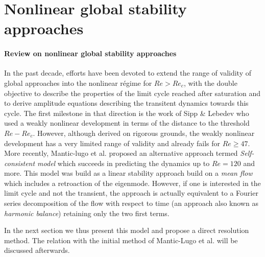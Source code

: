 \documentclass[twocolumn,10pt]{asme2ej}
\begin{document}
\section{Nonlinear global stability approaches}
\vspace{.2cm}

\paragraph{Review on nonlinear global stability approaches}
In the past decade, efforts have been devoted to extend the range of validity of global approaches into the nonlinear régime for $Re>Re_c$, with the double objective to describe the properties of the limit cycle reached after saturation and to derive amplitude equations describing the transitent dynamics towards this cycle.
 The first milestone in that direction is the work of Sipp \& Lebedev who used a weakly nonlinear development in terms of the distance to the threshold $Re-Re_c$. However, although derived on rigorous grounds, the weakly nonlinear development has a very limited range of validity and already fails for $Re\ge47$.
More recently,  Mantic-lugo et al.  proposed an alternative approach termed {\em Self-consistent model} which succeeds in predicting the dynamics up to $Re =120$ and more. 
This model was build as a linear stability approach build on a {\em mean flow} which includes a 
retroaction of the eigenmode. However, if one is interested in the limit cycle and not the transient,
the approach is actually equivalent to a Fourier series decomposition of the flow with respect to time (an approach also known as {\em harmonic balance}) retaining only the two first terms. 

In the next section we thus present this model and propose a direct resolution method. The relation with the initial method of Mantic-Lugo et al. will be discussed afterwards.
\end{document}
